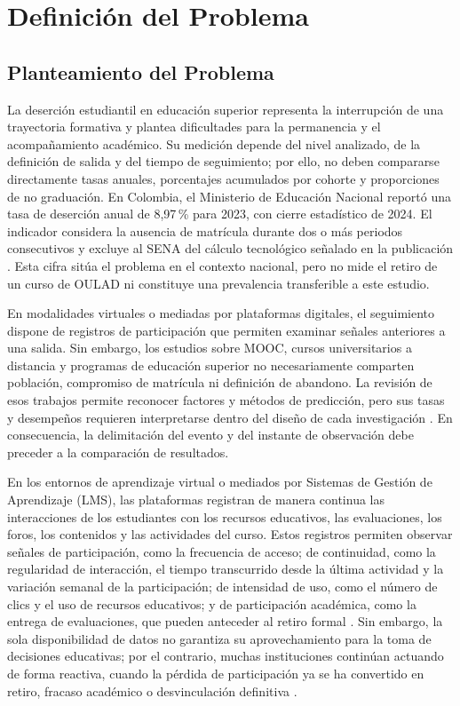 
\section{Definición del Problema}

\subsection{Planteamiento del Problema}




La deserción estudiantil en educación superior representa la interrupción de una trayectoria formativa y plantea dificultades para la permanencia y el acompañamiento académico. Su medición depende del nivel analizado, de la definición de salida y del tiempo de seguimiento; por ello, no deben compararse directamente tasas anuales, porcentajes acumulados por cohorte y proporciones de no graduación. En Colombia, el Ministerio de Educación Nacional reportó una tasa de deserción anual de 8,97\,\% para 2023, con cierre estadístico de 2024. El indicador considera la ausencia de matrícula durante dos o más periodos consecutivos y excluye al SENA del cálculo tecnológico señalado en la publicación \cite{revspadies2023}. Esta cifra sitúa el problema en el contexto nacional, pero no mide el retiro de un curso de OULAD ni constituye una prevalencia transferible a este estudio.

En modalidades virtuales o mediadas por plataformas digitales, el seguimiento dispone de registros de participación que permiten examinar señales anteriores a una salida. Sin embargo, los estudios sobre MOOC, cursos universitarios a distancia y programas de educación superior no necesariamente comparten población, compromiso de matrícula ni definición de abandono. La revisión de esos trabajos permite reconocer factores y métodos de predicción, pero sus tasas y desempeños requieren interpretarse dentro del diseño de cada investigación \cite{1049482020222124425,0007767901540164}. En consecuencia, la delimitación del evento y del instante de observación debe preceder a la comparación de resultados.

En los entornos de aprendizaje virtual o mediados por Sistemas de Gestión de Aprendizaje (LMS), las plataformas registran de manera continua las interacciones de los estudiantes con los recursos educativos, las evaluaciones, los foros, los contenidos y las actividades del curso. Estos registros permiten observar señales de participación, como la frecuencia de acceso; de continuidad, como la regularidad de interacción, el tiempo transcurrido desde la última actividad y la variación semanal de la participación; de intensidad de uso, como el número de clics y el uso de recursos educativos; y de participación académica, como la entrega de evaluaciones, que pueden anteceder al retiro formal \cite{sdata2017171,0007767901540164}. Sin embargo, la sola disponibilidad de datos no garantiza su aprovechamiento para la toma de decisiones educativas; por el contrario, muchas instituciones continúan actuando de forma reactiva, cuando la pérdida de participación ya se ha convertido en retiro, fracaso académico o desvinculación definitiva \cite{eks30080}.
 

